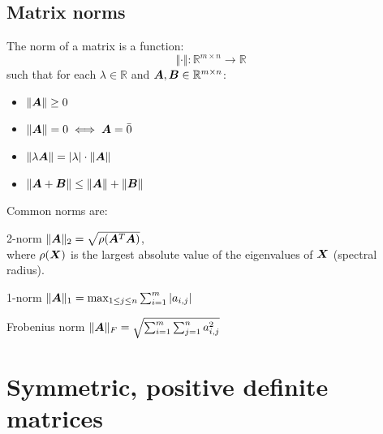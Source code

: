 \subsection{Matrix norms}
The norm of a matrix is a function: 
\begin{equation*}
    \Vert \cdot \Vert: \mathbb{R}^{m \times n} \rightarrow \mathbb{R}
\end{equation*}
such that for each $\lambda \in \mathbb{R}$ and ${\bm{A}}, {\bm{B}} \in \mathbb{R}^{m \times n}$:
\begin{itemize}
    \item $\Vert {\bm{A}} \Vert \geq 0$
    \item $\Vert {\bm{A}} \Vert = 0 \iff {\bm{A}} = \bar{0}$
    \item $\Vert \lambda {\bm{A}} \Vert = \vert \lambda \vert \cdot \Vert {\bm{A}} \Vert$
    \item $\Vert {\bm{A}} + {\bm{B}} \Vert \leq \Vert {\bm{A}} \Vert + \Vert {\bm{B}} \Vert$
\end{itemize}
%
Common norms are:
\begin{descriptionlist}
    \item[2-norm] 
        $\Vert {\bm{A}} \Vert_2 = \sqrt{ \rho({\bm{A}}^T{\bm{A}}) }$,\\
        where $\rho({\bm{X}})$ is the largest absolute value of the eigenvalues of ${\bm{X}}$ (spectral radius).
    
    \item[1-norm] $\Vert {\bm{A}} \Vert_1 = \max_{1 \leq j \leq n} \sum_{i=1}^{m} \vert a_{i,j} \vert$
    
    \item[Frobenius norm] $\Vert {\bm{A}} \Vert_F = \sqrt{ \sum_{i=1}^{m} \sum_{j=1}^{n} a_{i,j}^2 }$
\end{descriptionlist}



\section{Symmetric, positive definite matrices}

